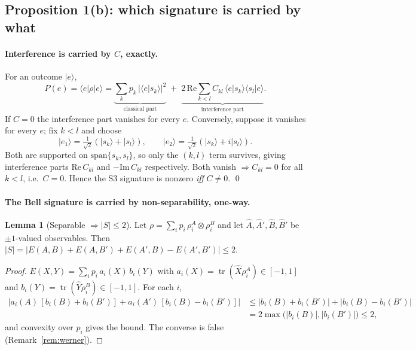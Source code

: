 \documentclass[11pt]{article}
\newcommand{\ket}[1]{\lvert #1 \rangle}
\newcommand{\bra}[1]{\langle #1 \rvert}
\newcommand{\tr}{\operatorname{tr}}
\theoremstyle{definition}
\newtheorem{qlem}{Lemma}
\begin{document}
\subsection{Proposition 1(b): which signature is carried by what}
\paragraph{Interference is carried by $C$, exactly.}
For an outcome $\ket e$,
\begin{equation}\label{eq:born}
P(e)=\bra e\rho\ket e=\underbrace{\sum_k p_k\,\lvert\langle e|s_k\rangle\rvert^2}_{\text{classical part}}\;+\;\underbrace{2\,\mathrm{Re}\!\!\sum_{k<l}C_{kl}\,\langle e|s_k\rangle\langle s_l|e\rangle}_{\text{interference part}} .
\end{equation}
If $C=0$ the interference part vanishes for every $e$. Conversely, suppose it vanishes for every $e$; fix $k<l$ and choose
\[
\ket{e_1}=\tfrac{1}{\sqrt2}(\ket{s_k}+\ket{s_l}),\qquad
\ket{e_2}=\tfrac{1}{\sqrt2}(\ket{s_k}+i\ket{s_l}).
\]
Both are supported on $\mathrm{span}\{s_k,s_l\}$, so only the $(k,l)$ term survives, giving interference parts $\mathrm{Re}\,C_{kl}$ and $-\mathrm{Im}\,C_{kl}$ respectively. Both vanish $\Rightarrow C_{kl}=0$ for all $k<l$, i.e.\ $C=0$. Hence the S3 signature is nonzero \emph{iff} $C\neq0$. \qed

\paragraph{The Bell signature is carried by non-separability, one-way.}
\begin{qlem}[Separable $\Rightarrow\lvert S\rvert\le2$]
Let $\rho=\sum_i p_i\,\rho_i^{A}\otimes\rho_i^{B}$ and let $\hat A,\hat A',\hat B,\hat B'$ be $\pm1$-valued observables. Then $\lvert S\rvert=\lvert E(A,B)+E(A,B')+E(A',B)-E(A',B')\rvert\le2$.
\end{qlem}
\begin{proof}
$E(X,Y)=\sum_i p_i\,a_i(X)\,b_i(Y)$ with $a_i(X)=\tr(\hat X\rho_i^A)\in[-1,1]$ and $b_i(Y)=\tr(\hat Y\rho_i^B)\in[-1,1]$. For each $i$,
\begin{align*}
\big\lvert a_i(A)\,[b_i(B)+b_i(B')]+a_i(A')\,[b_i(B)-b_i(B')]\big\rvert
&\le \lvert b_i(B)+b_i(B')\rvert+\lvert b_i(B)-b_i(B')\rvert\\
&= 2\max\big(\lvert b_i(B)\rvert,\lvert b_i(B')\rvert\big)\le2,
\end{align*}
and convexity over $p_i$ gives the bound. The converse is false (Remark~\ref{rem:werner}).
\end{proof}
\end{document}
